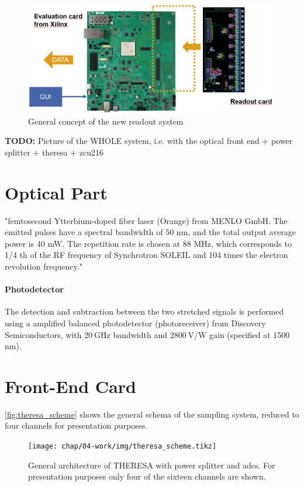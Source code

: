 \begin{figure}[tbh]
	\centering
	\includegraphics[width = \textwidth]{chap/04-work/img/concept_theresa}
	\caption{General concept of the new readout system}
	\label{fig:concept_theresa}
\end{figure}
\textbf{TODO:} Picture of the WHOLE system, i.e. with the optical front end + power splitter + theresa + zcu216

\section{Optical Part}
"femtosecond Ytterbium-doped fiber laser (Orange) from MENLO GmbH. The emitted pulses have a spectral bandwidth of 50 nm, and the total
output average power is 40 mW. The repetition rate is chosen at 88 MHz, which corresponds to 1/4 th of
the RF frequency of Synchrotron SOLEIL and 104 times the electron revolution frequency."

\paragraph{Photodetector}
The detection and subtraction between the two stretched signals is performed using a amplified balanced photodetector (photoreceiver) from Discovery Semiconductors, with 20 GHz bandwidth and 2800 V/W gain (specified at 1500 nm).

\section{Front-End Card}
\autoref{fig:theresa_scheme} shows the general schema of the sampling system, reduced to four channels for presentation purposes.
\begin{figure}[H]
	\centering
	\texttt{[image: chap/04-work/img/theresa\_scheme.tikz]}
	\caption[General architecture of THERESA]{General architecture of THERESA with power splitter and \glspl{adc}. For presentation purposes only four of the sixteen channels are shown.}
	\label{fig:theresa_scheme}
\end{figure}

